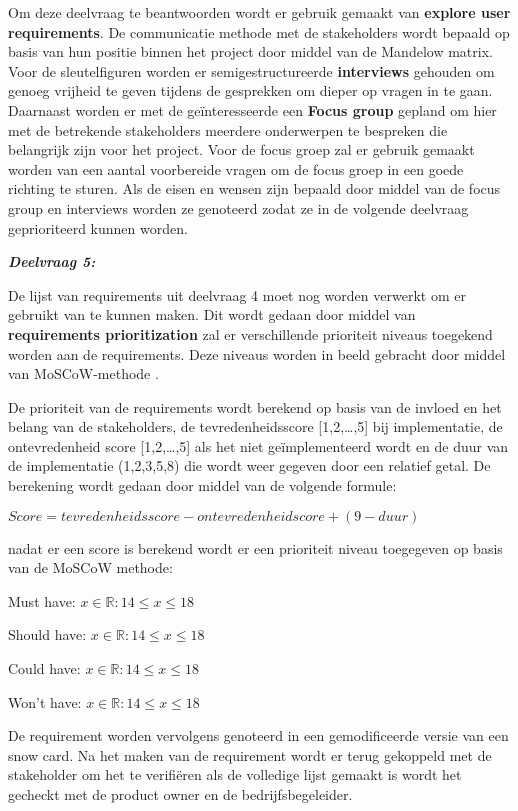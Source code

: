 \whitespace
Om deze deelvraag te beantwoorden wordt er gebruik gemaakt van \textbf{explore user requirements}.
De communicatie methode met de stakeholders wordt bepaald op basis van hun positie binnen het project door middel van de Mandelow matrix.
Voor de sleutelfiguren worden er semigestructureerde \textbf{interviews} gehouden om genoeg vrijheid te geven tijdens de gesprekken om dieper op vragen in te gaan.
Daarnaast worden er met de geïnteresseerde een \textbf{Focus group} gepland om hier met de betrekende stakeholders meerdere onderwerpen te bespreken die belangrijk zijn voor het project.
Voor de focus groep zal er gebruik gemaakt worden van een aantal voorbereide vragen om de focus groep in een goede richting te sturen.
Als de eisen en wensen zijn bepaald door middel van de focus group en interviews worden ze genoteerd zodat ze in de volgende deelvraag geprioriteerd kunnen worden.

\whitespace
\textit{\textbf{Deelvraag 5:} \SubquestionFive}

\whitespace
De lijst van requirements uit deelvraag 4 moet nog worden verwerkt om er gebruikt van te kunnen maken.
Dit wordt gedaan door middel van \textbf{requirements prioritization} zal er verschillende prioriteit niveaus toegekend worden aan de requirements.
Deze niveaus worden in beeld gebracht door middel van MoSCoW-methode \Parencite{MoSCoW}.

De prioriteit van de requirements wordt berekend op basis van de invloed en het belang van de stakeholders,
de tevredenheidsscore [1,2,\ldots,5] bij implementatie, de ontevredenheid score [1,2,\ldots,5] als het niet geïmplementeerd wordt en de duur van de implementatie (1,2,3,5,8) die wordt weer gegeven door een relatief getal.
De berekening wordt gedaan door middel van de volgende formule:

\whitespace
\begin{center}
	\(Score = tevredenheidsscore - ontevredenheid score + (9 - duur)\)
\end{center}

\whitespace
nadat er een score is berekend wordt er een prioriteit niveau toegegeven op basis van de MoSCoW methode:

\whitespace
Must have:  \(x \in \mathbb{R} : 14 \leq x \leq 18\)

\whitespace
Should have: \(x \in \mathbb{R} : 14 \leq x \leq 18\)

\whitespace
Could have: \(x \in \mathbb{R} : 14 \leq x \leq 18\)

\whitespace
Won't have: \(x \in \mathbb{R} : 14 \leq x \leq 18\)

\whitespace
De requirement worden vervolgens genoteerd in een gemodificeerde versie van een snow card.
Na het maken van de requirement wordt er terug gekoppeld met de stakeholder om het te verifiëren
als de volledige lijst gemaakt is wordt het gecheckt met de product owner en de bedrijfsbegeleider.

